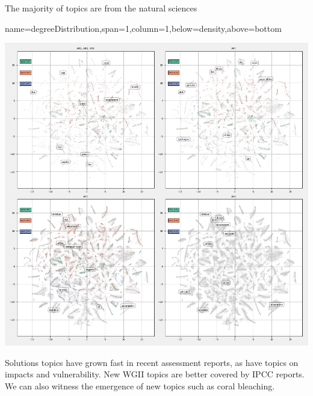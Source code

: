 \documentclass[a0paper,portrait]{baposter}
\begin{document}
\begin{poster}
{\begin{minipage}{0.24\linewidth}
	 The majority of topics are from the natural sciences
\end{minipage}

}

{name=degreeDistribution,span=1,column=1,below=density,above=bottom}{
	
\begin{center}
	\includegraphics[width=0.98\linewidth]{../tsne_results/plots/run_1771_s_0_p200_evolution_4.png}
\end{center}

Solutions topics have grown fast in recent assessment reports, as have topics on impacts and vulnerability. New WGII topics are better covered by IPCC reports. We can also witness the emergence of new topics such as coral bleaching.
	
}


\end{poster}
\end{document}
